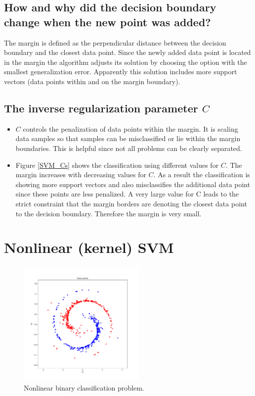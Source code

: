 \documentclass{article}
\begin{document}
\subsection{How and why did the decision boundary change when the new point was added?}

The margin is defined as the perpendicular distance between the decision boundary and the closest data point. Since the newly added data point is located in the margin the algorithm adjusts its solution by choosing the option with the smallest generalization error. Apparently this solution includes more support vectors (data points within and on the margin boundary).

\subsection{The inverse regularization parameter $C$}

\begin{itemize}

	\item $C$ controls the penalization of data points within the margin. It is scaling data samples so that samples can be misclassified or lie within the margin boundaries. This is helpful since not all problems can be clearly separated.

	\item Figure \ref{SVM_Cs} shows the classification using different values for $C$. The margin increases with decreasing values for $C$. As a result the classification is showing more support vectors and also misclassifies the additional data point since these points are less penalized.
	    A very large value for C leads to the strict constraint that the margin borders are denoting the closest data point to the decision boundary. Therefore the margin is very small.

\end{itemize}

\clearpage
\section{Nonlinear (kernel) SVM}

\begin{figure}[!ht]
\centering
\includegraphics[width=0.55\textwidth]{./Figures/2_data.pdf}
\caption{Nonlinear binary classification problem.}
\label{2_data}
\end{figure}
\end{document}
